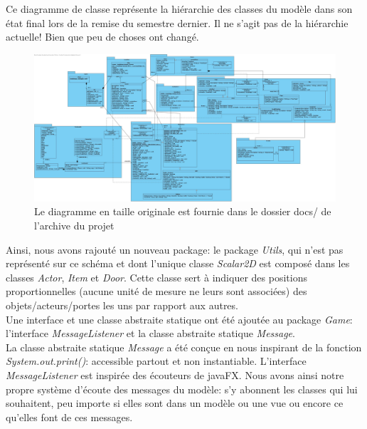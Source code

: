 \documentclass[./standalone.tex]{subfiles}
\begin{document}
Ce diagramme de classe représente la hiérarchie des classes du modèle dans son état final lors de la remise du semestre dernier. Il ne s'agit pas de la hiérarchie actuelle! Bien que peu de choses ont changé.\\

\begin{flushleft}
	\begin{figure}[h!]
	\advance\leftskip-2.2cm
	\includegraphics[scale=0.19]{images/SIS.jpg}
	\caption{Le diagramme en taille originale est fournie dans le dossier docs/ de l'archive du projet}
	\end{figure}
\end{flushleft}

Ainsi, nous avons rajouté un nouveau package: le package \textit{Utils}, qui n'est pas représenté sur ce schéma et dont l'unique classe \textit{Scalar2D} est composé dans les classes \textit{Actor}, \textit{Item} et \textit{Door}. Cette classe sert à indiquer des positions proportionnelles (aucune unité de mesure ne leurs sont associées) des objets/acteurs/portes les uns par rapport aux autres.\\

Une interface et une classe abstraite statique ont été ajoutée au package \textit{Game}: l'interface \textit{MessageListener} et la classe abstraite statique \textit{Message}.\\

La classe abstraite statique \textit{Message} a été conçue en nous inspirant de la fonction \textit{System.out.print()}: accessible partout et non instantiable. L'interface \textit{MessageListener} est inspirée des écouteurs de javaFX. Nous avons ainsi notre propre système d'écoute des messages du modèle: s'y abonnent les classes qui lui souhaitent, peu importe si elles sont dans un modèle ou une vue ou encore ce qu'elles font de ces messages.

\newpage
\end{document}
